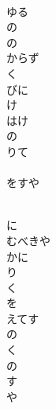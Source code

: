 \documentclass[10pt,b5j]{tarticle} %
\begin{document}
\vspace{1.5em} %
\newcommand{\linespace}{0.5em} %
\newcommand{\blocksize}{0.5\hsize} %
\newcommand{\itemmargin}{3em} %
\begin{enumerate} %
    \setlength{\itemindent}{\itemmargin} %
    \begin{minipage}[c]{\blocksize}
    
        \vspace{\linespace}
        \item~\\
        ゆる\\
        の\\
        の\\
        からず\\
        く\\
        びに\\
        け\\
        はけ\\
        の\\
        りて\\
        \\
        をすや
        
    \end{minipage}
    \begin{minipage}[c]{\blocksize}
        
        \vspace{\linespace}
        \item~\\
        に\\
        むべきや\\
        かに\\
        り\\
        く\\
        を\\
        えてす\\
        の\\
        く\\
        の\\
        す\\
        や
        

\end{minipage}
\end{enumerate}
\end{document}
